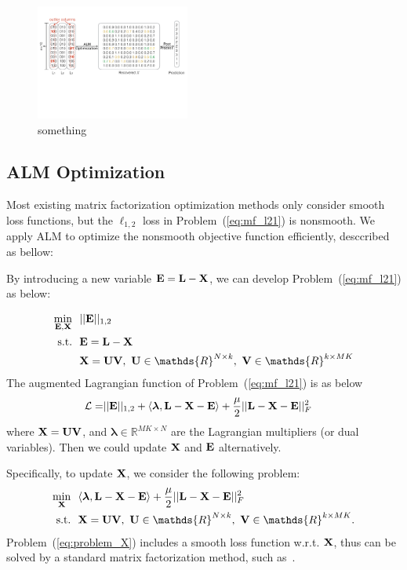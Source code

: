 \documentclass[letterpaper]{article}
\def\bE{{\bf E}}
\def\blambda{{\bm \lambda}}
\def\calL{{\mathcal{L}}}
\def\bL{{\bf L}}
\def\bU{{\bf U}}
\def\bV{{\bf V}}
\def\dsR{\mathds{R}}
\def\bX{{\bf X}}
\def\bX{{\bf X}}
\def\st{{\text{s.t.}}}
\begin{document}
\begin{figure}[h]
\centering\includegraphics[width=0.45\textwidth]{resource/frame_work.pdf}
\caption{something}\label{fig:framework}
\end{figure}


\subsection{ALM Optimization}
Most existing matrix factorization optimization methods only consider smooth loss functions, but the $\ell_{1,2}$ loss in Problem~(\ref{eq:mf_l21}) is nonsmooth.
We apply ALM to optimize the nonsmooth objective function efficiently, desccribed as bellow: 

By introducing a new variable $\bE = \bL - \bX$, we can develop Problem~(\ref{eq:mf_l21}) as below:

\begin{align}\label{eq:mf_l21_constrained}
  \min_{\bE, \bX} ~&~ || \bE ||_{1,2}   \nonumber \\
  \st             ~&~ \bE = \bL - \bX   \nonumber \\
                  ~&~ \bX = \bU \bV,~\bU \in \dsR^{N \times k},~\bV \in \dsR^{k \times MK}
\end{align}
The augmented Lagrangian function of Problem~(\ref{eq:mf_l21}) is as below
\begin{align}\label{eq:lagrangian_l21}
  \calL = & || \bE ||_{1,2} + \langle \blambda, \bL - \bX - \bE \rangle + \frac{\mu}{2} || \bL - \bX - \bE ||_F^2
\end{align}
\noindent
where $\bX = \bU \bV$,
and $\blambda \in \dsR^{MK \times N}$ are the Lagrangian multipliers (or dual variables).
Then we could update $\bX$ and $\bE$ alternatively.


Specifically, to update $\bX$, we consider the following problem:
\begin{align}\label{eq:problem_X}
  \min_{\bX} ~&~ \langle \blambda, \bL - \bX - \bE \rangle + \frac{\mu}{2} || \bL - \bX - \bE ||_F^2  \nonumber  \\
  \st        ~&~ \bX = \bU \bV,~\bU \in \dsR^{N \times k},~\bV \in \dsR^{k \times MK}   .
\end{align}
Problem~(\ref{eq:problem_X}) includes a smooth loss function w.r.t. $\bX$, thus can be solved by a standard matrix factorization method, such as~\cite{yanijcai2015scalable,tanicml2014riemannian,vandereyckensiamjo2013low}.
\end{document}
